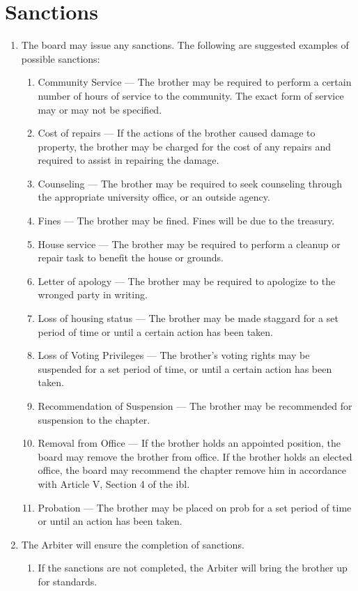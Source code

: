 \section{Sanctions}
	\begin{enumerate}
		\item The board may issue any sanctions.  The following are suggested examples of possible sanctions:
			\begin{enumerate}
				\item Community Service --- The brother may be required to perform a certain number of hours of service to the community.  The exact form of service may or may not be specified.
				\item Cost of repairs --- If the actions of the brother caused damage to property, the brother may be charged for the cost of any repairs and required to assist in repairing the damage.
				\item Counseling --- The brother may be required to seek counseling through the appropriate university office, or an outside agency.
				\item Fines --- The brother may be fined.  Fines will be due to the treasury.
				\item House service --- The brother may be required to perform a cleanup or repair task to benefit the house or grounds.
				\item Letter of apology --- The brother may be required to apologize to the wronged party in writing.
				\item Loss of housing status --- The brother may be made \gls{staggard} for a set period of time or until a certain action has been taken.
				\item Loss of Voting Privileges --- The brother's voting rights may be suspended for a set period of time, or until a certain action has been taken.
				\item Recommendation of Suspension --- The brother may be recommended for suspension to the chapter.
				\item Removal from Office --- If the brother holds an appointed position, the board may remove the brother from office. If the brother holds an elected office, the board may recommend the chapter remove him in accordance with Article V, Section 4 of the \gls{ibl}.
				\item Probation --- The brother may be placed on \gls{prob} for a set period of time or until an action has been taken.
			\end{enumerate}
		\item The Arbiter will ensure the completion of sanctions.
			\begin{enumerate}
				\item If the sanctions are not completed, the Arbiter will bring the brother up for standards.
			\end{enumerate}
	\end{enumerate}


